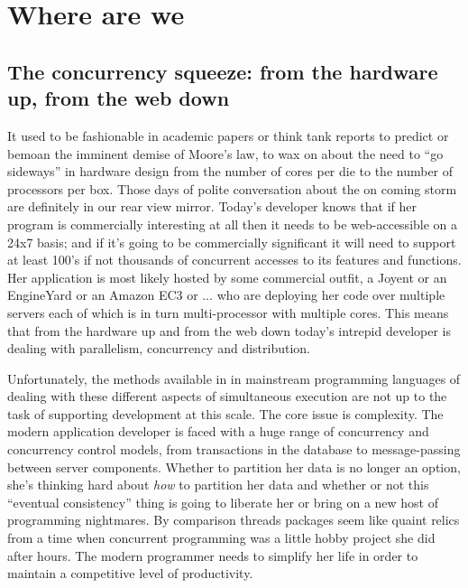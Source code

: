 \section{Where are we}

\subsection{The concurrency squeeze: from the hardware up, from the web down}

It used to be fashionable in academic papers or think tank reports to
predict or bemoan the imminent demise of Moore's law, to wax on about
the need to ``go sideways'' in hardware design from the number of
cores per die to the number of processors per box. Those days of
polite conversation about the on coming storm are definitely in our
rear view mirror. Today's developer knows that if her program is
commercially interesting at all then it needs to be web-accessible on
a 24x7 basis; and if it's going to be commercially significant it will
need to support at least 100's if not thousands of concurrent accesses
to its features and functions. Her application is most likely hosted
by some commercial outfit, a Joyent or an EngineYard or an Amazon EC3
or $\ldots$ who are deploying her code over multiple servers each of
which is in turn multi-processor with multiple cores. This means that
from the hardware up and from the web down today's intrepid developer
is dealing with parallelism, concurrency and distribution.

Unfortunately, the methods available in in mainstream programming
languages of dealing with these different aspects of simultaneous
execution are not up to the task of supporting development at this
scale. The core issue is complexity. The modern application developer
is faced with a huge range of concurrency and concurrency control
models, from transactions in the database to message-passing between
server components. Whether to partition her data is no longer an
option, she's thinking hard about \emph{how} to partition her data and
whether or not this ``eventual consistency'' thing is going to
liberate her or bring on a new host of programming nightmares. By
comparison threads packages seem like quaint relics from a time when
concurrent programming was a little hobby project she did after
hours. The modern programmer needs to simplify her life in order to
maintain a competitive level of productivity.


